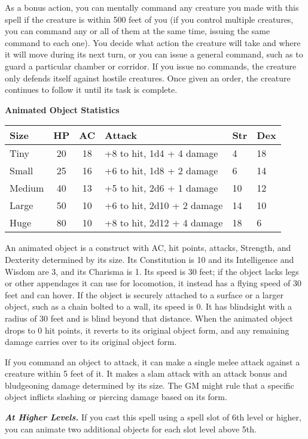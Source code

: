 \documentclass[
]{article}
\begin{document}
As a bonus action, you can mentally command any creature you made with
this spell if the creature is within 500 feet of you (if you control
multiple creatures, you can command any or all of them at the same time,
issuing the same command to each one). You decide what action the
creature will take and where it will move during its next turn, or you
can issue a general command, such as to guard a particular chamber or
corridor. If you issue no commands, the creature only defends itself
against hostile creatures. Once given an order, the creature continues
to follow it until its task is complete.

\textbf{Animated Object Statistics}

\begin{longtable}[]{@{}lcclll@{}}
\toprule
Size & HP & AC & Attack & Str & Dex\tabularnewline
\midrule
\endhead
Tiny & 20 & 18 & +8 to hit, 1d4 + 4 damage & 4 & 18\tabularnewline
Small & 25 & 16 & +6 to hit, 1d8 + 2 damage & 6 & 14\tabularnewline
Medium & 40 & 13 & +5 to hit, 2d6 + 1 damage & 10 & 12\tabularnewline
Large & 50 & 10 & +6 to hit, 2d10 + 2 damage & 14 & 10\tabularnewline
Huge & 80 & 10 & +8 to hit, 2d12 + 4 damage & 18 & 6\tabularnewline
\bottomrule
\end{longtable}

An animated object is a construct with AC, hit points, attacks,
Strength, and Dexterity determined by its size. Its Constitution is 10
and its Intelligence and Wisdom are 3, and its Charisma is 1. Its speed
is 30 feet; if the object lacks legs or other appendages it can use for
locomotion, it instead has a flying speed of 30 feet and can hover. If
the object is securely attached to a surface or a larger object, such as
a chain bolted to a wall, its speed is 0. It has blindsight with a
radius of 30 feet and is blind beyond that distance. When the animated
object drops to 0 hit points, it reverts to its original object form,
and any remaining damage carries over to its original object form.

If you command an object to attack, it can make a single melee attack
against a creature within 5 feet of it. It makes a slam attack with an
attack bonus and bludgeoning damage determined by its size. The GM might
rule that a specific object inflicts slashing or piercing damage based
on its form.

\emph{\textbf{At Higher Levels.}} If you cast this spell using a spell
slot of 6th level or higher, you can animate two additional objects for
each slot level above 5th.
\end{document}
